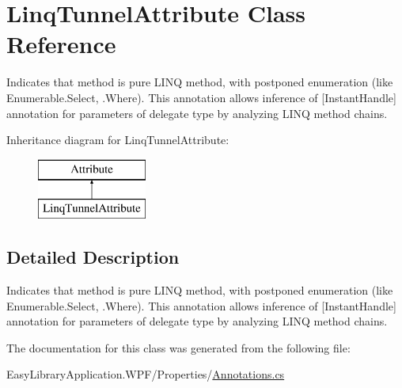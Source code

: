 \hypertarget{class_linq_tunnel_attribute}{}\section{Linq\+Tunnel\+Attribute Class Reference}
\label{class_linq_tunnel_attribute}


Indicates that method is pure L\+I\+NQ method, with postponed enumeration (like Enumerable.\+Select, .Where). This annotation allows inference of \mbox{[}Instant\+Handle\mbox{]} annotation for parameters of delegate type by analyzing L\+I\+NQ method chains.  


Inheritance diagram for Linq\+Tunnel\+Attribute\+:\begin{figure}[H]
\begin{center}
\leavevmode
\includegraphics[height=2.000000cm]{class_linq_tunnel_attribute}
\end{center}
\end{figure}


\subsection{Detailed Description}
Indicates that method is pure L\+I\+NQ method, with postponed enumeration (like Enumerable.\+Select, .Where). This annotation allows inference of \mbox{[}Instant\+Handle\mbox{]} annotation for parameters of delegate type by analyzing L\+I\+NQ method chains. 



The documentation for this class was generated from the following file\+:\begin{DoxyCompactItemize}
\item 
Easy\+Library\+Application.\+W\+P\+F/\+Properties/\mbox{\hyperlink{_annotations_8cs}{Annotations.\+cs}}\end{DoxyCompactItemize}
